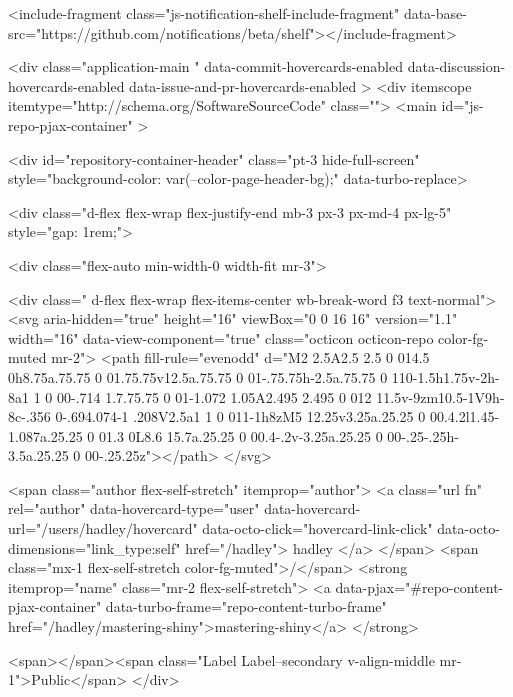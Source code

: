     
    <include-fragment class="js-notification-shelf-include-fragment" data-base-src="https://github.com/notifications/beta/shelf"></include-fragment>






  <div
    class="application-main "
    data-commit-hovercards-enabled
    data-discussion-hovercards-enabled
    data-issue-and-pr-hovercards-enabled
  >
        <div itemscope itemtype="http://schema.org/SoftwareSourceCode" class="">
    <main id="js-repo-pjax-container" >
      
  


    






  
  <div id="repository-container-header"  class="pt-3 hide-full-screen" style="background-color: var(--color-page-header-bg);" data-turbo-replace>

      <div class="d-flex flex-wrap flex-justify-end mb-3  px-3 px-md-4 px-lg-5" style="gap: 1rem;">

        <div class="flex-auto min-width-0 width-fit mr-3">
            
  <div class=" d-flex flex-wrap flex-items-center wb-break-word f3 text-normal">
      <svg aria-hidden="true" height="16" viewBox="0 0 16 16" version="1.1" width="16" data-view-component="true" class="octicon octicon-repo color-fg-muted mr-2">
    <path fill-rule="evenodd" d="M2 2.5A2.5 2.5 0 014.5 0h8.75a.75.75 0 01.75.75v12.5a.75.75 0 01-.75.75h-2.5a.75.75 0 110-1.5h1.75v-2h-8a1 1 0 00-.714 1.7.75.75 0 01-1.072 1.05A2.495 2.495 0 012 11.5v-9zm10.5-1V9h-8c-.356 0-.694.074-1 .208V2.5a1 1 0 011-1h8zM5 12.25v3.25a.25.25 0 00.4.2l1.45-1.087a.25.25 0 01.3 0L8.6 15.7a.25.25 0 00.4-.2v-3.25a.25.25 0 00-.25-.25h-3.5a.25.25 0 00-.25.25z"></path>
</svg>
    
    <span class="author flex-self-stretch" itemprop="author">
      <a class="url fn" rel="author" data-hovercard-type="user" data-hovercard-url="/users/hadley/hovercard" data-octo-click="hovercard-link-click" data-octo-dimensions="link_type:self" href="/hadley">
        hadley
</a>    </span>
    <span class="mx-1 flex-self-stretch color-fg-muted">/</span>
    <strong itemprop="name" class="mr-2 flex-self-stretch">
      <a data-pjax="#repo-content-pjax-container" data-turbo-frame="repo-content-turbo-frame" href="/hadley/mastering-shiny">mastering-shiny</a>
    </strong>

    <span></span><span class="Label Label--secondary v-align-middle mr-1">Public</span>
  </div>


